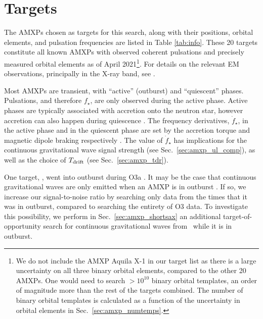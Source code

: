 \section{\label{sec:amxp_targets}Targets} 
The AMXPs chosen as targets for this search, along with their positions, orbital elements, and pulsation frequencies are listed in Table \ref{tab:info}. These 20 targets constitute all known AMXPs with observed coherent pulsations and precisely measured orbital elements as of April 2021\footnote{We do not include the AMXP Aquila X-1 \cite{Casella2008, MataSanchez2017} in our target list as there is a large uncertainty on all three binary orbital elements, compared to the other 20 AMXPs. One would need to search $>10^{10}$ binary orbital templates, an order of magnitude more than the rest of the targets combined. The number of binary orbital templates is calculated as a function of the uncertainty in orbital elements in Sec.~\ref{sec:amxp_numtemps}.}. For details on the relevant EM observations, principally in the X-ray band, see \citet{Watts2008, Marino2019, DiSalvo2022, Patruno2021}.

Most AMXPs are transient, with ``active'' (outburst) and ``quiescent'' phases. Pulsations, and therefore $f_\star$, are only observed during the active phase. Active phases are typically associated with accretion onto the neutron star, however accretion can also happen during quiescence \cite{Melatos2016}. The frequency derivatives, $\dot{f}_\star$, in the active phase and in the quiescent phase are set by the accretion torque and magnetic dipole braking respectively \cite{Ghosh1977, Melatos2016}. The value of $\dot{f}_\star$ has implications for the continuous gravitational wave signal strength (see Sec.~\ref{sec:amxp_ul_comp}), as well as the choice of $T_{\textrm{drift}}$ (see Sec.~\ref{sec:amxp_tdr}).

One target, \sax, went into outburst during O3a \cite{Bult2019, Bult2020, Goodwin2020}. It may be the case that continuous gravitational waves are only emitted when an AMXP is in outburst \cite{Haskell2017a}. If so, we increase our signal-to-noise ratio by searching only data from the times that it was in outburst, compared to searching the entirety of O3 data. To investigate this possibility, we perform in Sec.~\ref{sec:amxp_shortsax} an additional target-of-opportunity search for continuous gravitational waves from \sax\ while it is in outburst.

